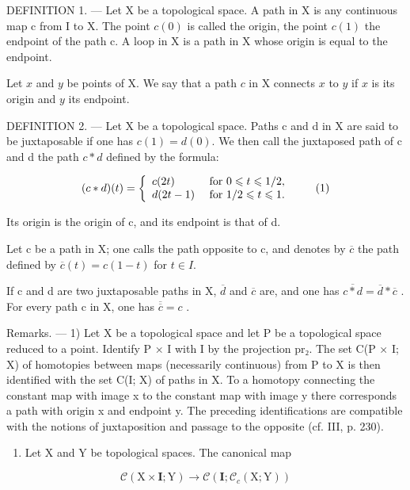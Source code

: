 DEFINITION 1. --- Let X be a topological space. A path in X is any continuous map c from I to X. The point \(c(0)\) is called the origin, the point \(c(1)\) the endpoint of the path c. A loop in X is a path in X whose origin is equal to the endpoint.

Let \(x\) and \(y\) be points of X. We say that a path \(c\) in X connects \(x\) to \(y\) if \(x\) is its origin and \(y\) its endpoint.

DEFINITION 2. --- Let X be a topological space. Paths c and d in X are said to be juxtaposable if one has \(c(1) = d(0)\). We then call the juxtaposed path of c and d the path \(c*d\) defined by the formula:

\[
(c * d) (t) = \left\{ \begin{array}{l l} c (2 t) & \text { for } 0 \leqslant t \leqslant 1 / 2, \\ d (2 t - 1) & \text { for } 1 / 2 \leqslant t \leqslant 1. \end{array} \right.\tag{1}
\]

Its origin is the origin of c, and its endpoint is that of d.

Let c be a path in X; one calls the path opposite to c, and denotes by \(\overline{c}\) the path defined by \(\overline{c}(t) = c(1 - t)\) for \(t \in I\).

If c and d are two juxtaposable paths in X, \(\overline{d}\) and \(\overline{c}\) are, and one has \(\overline{c*d} = \overline{d} * \overline{c}\) . For every path c in X, one has \(\overline{\overline{c}} = c\) .

Remarks. --- 1) Let X be a topological space and let P be a topological space reduced to a point. Identify P × I with I by the projection pr₂. The set C(P × I; X) of homotopies between maps (necessarily continuous) from P to X is then identified with the set C(I; X) of paths in X. To a homotopy connecting the constant map with image x to the constant map with image y there corresponds a path with origin x and endpoint y. The preceding identifications are compatible with the notions of juxtaposition and passage to the opposite (cf. III, p. 230).

\begin{enumerate}
\def\labelenumi{\arabic{enumi})}
\setcounter{enumi}{1}
\tightlist
\item
  Let X and Y be topological spaces. The canonical map
\end{enumerate}

\[
\mathcal {C} (\mathrm{X} \times \mathbf {I}; \mathrm{Y}) \rightarrow \mathcal {C} (\mathbf {I}; \mathcal {C} _ {c} (\mathrm{X}; \mathrm{Y}))
\]

